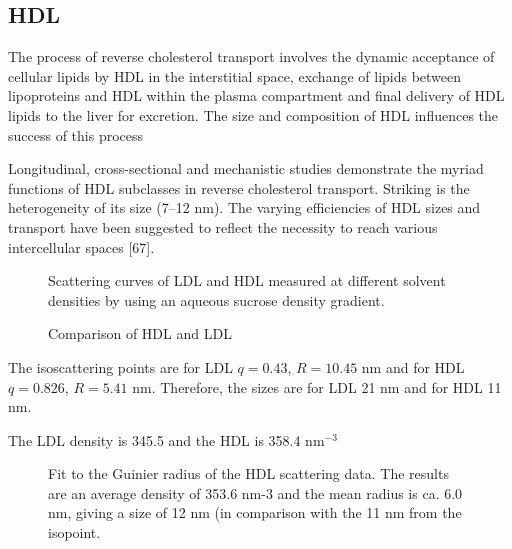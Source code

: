 \subsection{HDL}

The process of reverse cholesterol transport involves the dynamic acceptance of cellular lipids by HDL in the interstitial space, exchange of lipids between lipoproteins and HDL within the plasma compartment and final delivery of HDL lipids to the liver for excretion. The size and composition of HDL influences the success of this process

Longitudinal, cross-sectional and mechanistic studies demonstrate the myriad functions of HDL subclasses in reverse cholesterol transport. Striking is the heterogeneity of its size (7–12 nm). The varying efficiencies of HDL sizes and transport have been suggested to reflect the necessity to reach various intercellular spaces [67].
\begin{figure}
	\centering
		\subfloat[HDL]{\resizebox{0.44\linewidth}{!}{}\label{fig:HDLContinuousSAXS}}
		\subfloat[LDL]{\resizebox{0.44\linewidth}{!}{}\label{fig:LDLContinuousSAXS}}
		\caption{Scattering curves of LDL and HDL measured at different solvent densities by using an aqueous sucrose density gradient.}
\end{figure}

\begin{figure}
	\centering
		\caption{Comparison of HDL and LDL}
\end{figure}

The isoscattering points are for LDL $q=0.43$, $R=10.45$ nm and for HDL $q=0.826$, $R=5.41$ nm. Therefore, the sizes are for LDL 21 nm and for HDL 11 nm.

The LDL density is 345.5 and the HDL is 358.4 nm$^{-3}$

\begin{figure}
	\centering
		
		\caption{Fit to the Guinier radius of the HDL scattering data. The results are an average density of 353.6 nm-3 and the mean radius is ca. 6.0 nm, giving a size of 12 nm (in comparison with the 11 nm from the isopoint.}
		\label{fig:HDLGuinierRadius}
\end{figure}

